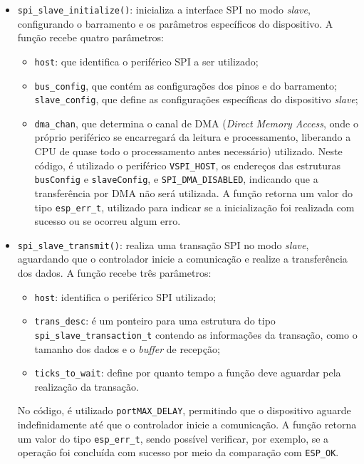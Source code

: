 \documentclass[a4paper,oneside,10pt]{article}
\begin{document}
\begin{itemize}
	\item \texttt{spi\_slave\_initialize()}: inicializa a interface SPI no modo \textit{slave}, configurando o barramento e os parâmetros específicos do dispositivo. A função recebe quatro parâmetros:
	\begin{itemize}
		\item \texttt{host}: que identifica o periférico SPI a ser utilizado;
		\item \texttt{bus\_config}, que contém as configurações dos pinos e do barramento; \texttt{slave\_config}, que define as configurações específicas do dispositivo \textit{slave};
		\item \texttt{dma\_chan}, que determina o canal de DMA (\textit{Direct Memory Access}, onde o próprio periférico se encarregará da leitura e processamento, liberando a CPU de quase todo o processamento antes necessário) utilizado. Neste código, é utilizado o periférico \texttt{VSPI\_HOST}, os endereços das estruturas \texttt{busConfig} e \texttt{slaveConfig}, e \texttt{SPI\_DMA\_DISABLED}, indicando que a transferência por DMA não será utilizada. A função retorna um valor do tipo \texttt{esp\_err\_t}, utilizado para indicar se a inicialização foi realizada com sucesso ou se ocorreu algum erro.
	\end{itemize}
	\item \texttt{spi\_slave\_transmit()}: realiza uma transação SPI no modo \textit{slave}, aguardando que o controlador inicie a comunicação e realize a transferência dos dados. A função recebe três parâmetros:
	\begin{itemize}
		\item \texttt{host}: identifica o periférico SPI utilizado;
		\item \texttt{trans\_desc}: é um ponteiro para uma estrutura do tipo \texttt{spi\_slave\_transaction\_t} contendo as informações da transação, como o tamanho dos dados e o \textit{buffer} de recepção;
		\item \texttt{ticks\_to\_wait}: define por quanto tempo a função deve aguardar pela realização da transação.
	\end{itemize}  
	No código, é utilizado \texttt{portMAX\_DELAY}, permitindo que o dispositivo aguarde indefinidamente até que o controlador inicie a comunicação. A função retorna um valor do tipo \texttt{esp\_err\_t}, sendo possível verificar, por exemplo, se a operação foi concluída com sucesso por meio da comparação com \texttt{ESP\_OK}.
\end{itemize}
\newpage
\end{document}
